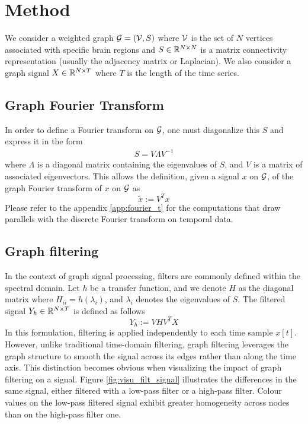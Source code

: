 \section{Method}


We consider a weighted graph $\mathcal{G} = (\mathcal{V}, S)$ where $\mathcal{V}$ is the set of $N$ vertices associated with specific brain regions and $S\in\mathbb{R}^{N\times N}$ is a matrix connectivity representation (usually the adjacency matrix or Laplacian). We also consider a graph signal $X\in\mathbb{R}^{N\times T}$ where $T$ is the length of the time series. 

\subsection{Graph Fourier Transform}

In order to define a Fourier transform on $\mathcal{G}$, one must diagonalize this $S$ and express it in the form
\begin{align}
    S = V\Lambda V^{-1}
\end{align}
where $\Lambda$ is a diagonal matrix containing the eigenvalues of $S$, and $V$ is a matrix of associated eigenvectors. This allows the definition, given a signal $x$ on $\mathcal{G}$, of the graph Fourier transform of $x$ on $\mathcal{G}$ as
\begin{equation}
    \widetilde{x} := V^Tx \label{eq:GFT}
\end{equation}
Please refer to the appendix \ref{app:fourier_t} for the computations that draw parallels with the discrete Fourier transform on temporal data.

\subsection{Graph filtering}
In the context of graph signal processing, filters are commonly defined within the spectral domain. Let $h$ be a transfer function, and we denote $H$ as the diagonal matrix where $H_{ii} = h(\lambda_i)$, and $\lambda_i$ denotes the eigenvalues of $S$. The filtered signal $Y_h\in \mathbb{R}^{N\times T}$ is defined as follows 
\begin{equation}
    Y_h := VHV^TX
\end{equation}
In this formulation, filtering is applied independently to each time sample $x[t]$. However, unlike traditional time-domain filtering, graph filtering leverages the graph structure to smooth the signal across its edges rather than along the time axis. This distinction becomes obvious when visualizing the impact of graph filtering on a signal. Figure \ref{fig:visu_filt_signal} illustrates the differences in the same signal, either filtered with a low-pass filter or a high-pass filter. Colour values on the low-pass filtered signal exhibit greater homogeneity across nodes than on the high-pass filter one. 

